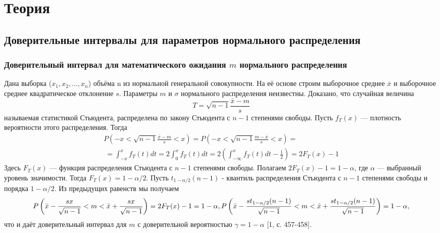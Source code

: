 \documentclass[12pt,a4paper]{scrartcl}
\begin{document}
\section{Теория}

\subsection{Доверительные интервалы для параметров нормального распределения}
	\subsubsection{Доверительный интервал для математического ожидания $m$ нормального распределения}
	Дана выборка ($x_{1},x_{2}, ... ,x_{n}$) объёма n из нормальной генеральной совокупности. На её основе строим выборочное среднее $\bar{x}$ и выборочное среднее квадратическое отклонение $s$. Параметры $m$ и $\sigma$ нормального распределения неизвестны.
	\newline
    Доказано, что случайная величина
    \begin{equation}
        T = \sqrt{n - 1}\frac{\bar{x} - m}{s}
        \label{T}
    \end{equation}
    называемая статистикой Стьюдента, распределена по закону Стьюдента с $n-1$ степенями свободы. Пусть $f_{T}(x)$ — плотность вероятности этого распределения. Тогда 
    \begin{multline}
        P\left(-x < \sqrt{n - 1}\frac{\bar{x} - m}{s} < x \right) = 
        P\left(-x < \sqrt{n - 1}\frac{m - \bar{x}}{s} < x \right) = \\\
        = \int_{-x}^{x}{f_{T}(t)dt} = 2 \int_{0}^{x}{f_{T}(t)dt} = 
        2\left(  \int_{-\infty}^{x}{f_{T}(t)dt} - \frac{1}{2} \right) = 2F_{T}(x) - 1
        \label{P_f_t}
    \end{multline}
    Здесь $F_{T}(x)$ — функция распределения Стьюдента с $n-1$ степенями свободы.
    \newline
    Полагаем $2F_{T}(x)-1 = 1-\alpha$, где $\alpha$ — выбранный уровень значимости. Тогда $F_{T}(x) = 1-\alpha/2$. Пусть $t_{1-\alpha/2}(n-1)$ - квантиль распределения Стьюдента с $n-1$ степенями свободы и порядка $1-\alpha/2$. Из предыдущих равенств мы получаем 
    \begin{equation}
             P\left(\bar{x} - \frac{sx}{\sqrt{n-1}} < m <  \bar{x} + \frac{sx}{\sqrt{n-1}}\right) = 2F_{T}(x) - 1 = 1 - \alpha,  \\
             P\left(\bar{x} - \frac{st_{1-\alpha/2}(n-1)}{\sqrt{n-1}} < m <  \bar{x} + \frac{st_{1-\alpha/2}(n-1)}{\sqrt{n-1}}\right)= 1 - \alpha,
        \label{P_m}         
    \end{equation}
    что и даёт доверительный интервал для $m$ с доверительной вероятностью $\gamma = 1-\alpha$ [1, с. 457-458].
    
\end{document}
